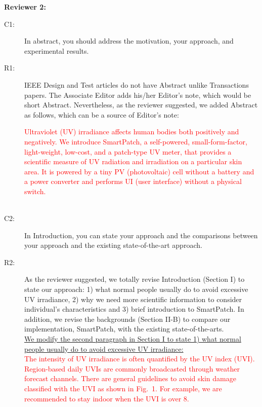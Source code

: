 \documentclass[onecolumn]{IEEEconf}
\begin{document}
\textbf{Reviewer 2:}
\begin{description}
\item [C1: ] In abstract, you should address the motivation, your approach, and experimental results.

\item [R1: ] IEEE Design and Test articles do not have Abstract unlike Transactions papers. The Associate Editor adds his/her Editor's note, which would be short Abstract. Nevertheless, as the reviewer suggested, we added Abstract as follows, which can be a source of Editor's note:

\textcolor{red}{Ultraviolet (UV) irradiance affects human bodies both positively and negatively. We introduce SmartPatch, a self-powered, small-form-factor, light-weight, low-cost, and a patch-type UV meter, that provides a scientific measure of UV radiation and irradiation on a particular skin area. It is powered by a tiny PV (photovoltaic) cell without a battery and a power converter and performs UI (user interface) without a physical switch.}\\
~\\

\item [C2: ] In Introduction, you can state your approach and the comparisons between your approach and the existing state-of-the-art approach.
\item [R2: ] As the reviewer suggested, we totally revise Introduction (Section I) to state our approach: 1) what normal people usually do to avoid excessive UV irradiance, 2) why we need more scientific information to consider individual's characteristics and 3) brief introduction to SmartPatch. In addition, we revise the backgrounds (Section II-B) to compare our implementation, SmartPatch, with the existing state-of-the-arts.\\

\uline{We modify the second paragraph in Section I to state 1) what normal people usually do to avoid excessive UV irradiance:}\\
%
\textcolor{red}{The intensity of UV irradiance is often quantified by the UV index (UVI). Region-based daily UVIs are commonly broadcasted through weather forecast channels. There are general guidelines to avoid skin damage classified with the UVI as shown in Fig.~1. For example, we are recommended to stay indoor when the UVI  is over 8.}\\


\end{description}
\end{document}
